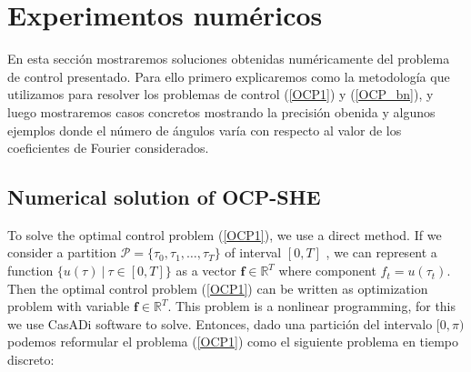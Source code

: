 \section{Experimentos numéricos}



En esta sección mostraremos soluciones obtenidas numéricamente del problema de control presentado. 
%
Para ello primero explicaremos como la metodología que utilizamos para resolver los problemas de control (\ref{OCP1}) y (\ref{OCP_bn}), y luego mostraremos casos concretos mostrando la precisión obenida y algunos ejemplos donde el número de ángulos varía con respecto al valor de los coeficientes de Fourier considerados.

\subsection{Numerical solution of OCP-SHE}

To solve the optimal control problem (\ref{OCP1}), we use a direct method. 
If we consider a partition $\mathcal{P} = \{\tau_0,\tau_1,\dots,\tau_{T}\}$ of interval $[0,T]$ , we can represent a function $\{ u(\tau) \ | \ \tau \in [0,T]\}$ as a vector $\bm{f} \in \mathbb{R}^{T}$ where component $f_t = u(\tau_t)$. Then the optimal control problem (\ref{OCP1}) can be written as optimization problem with variable $\bm{f} \in \mathbb{R}^{T}$. This problem is a nonlinear programming, for this we use CasADi software to solve. Entonces, dado una partición del intervalo $[0,\pi)$ podemos reformular el problema (\ref{OCP1}) como el siguiente problema en tiempo discreto:

